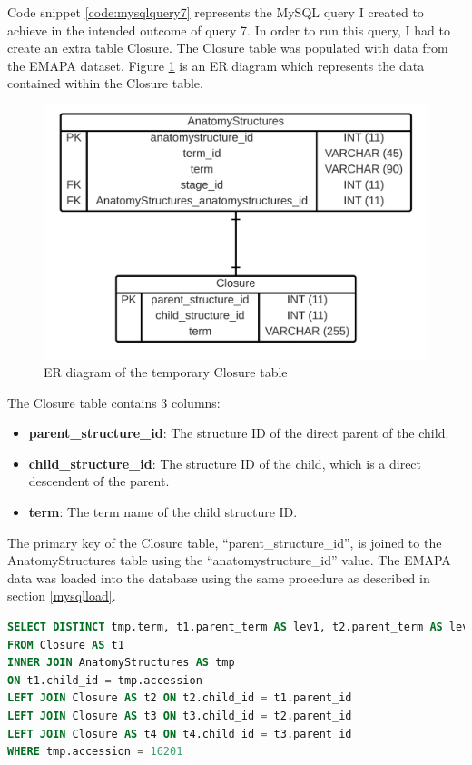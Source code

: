 Code snippet \ref{code:mysqlquery7} represents the MySQL query I created to achieve in the intended outcome of query 7. In order to run this query, I had to create an extra table Closure. The Closure table was populated with data from the EMAPA dataset. Figure \ref{fig:closuretable} is an ER diagram which represents the data contained within the Closure table.

\begin{figure}[H]\begin{center}\includegraphics[width=1\linewidth]{images/closuretableER}\caption{ER diagram of the temporary Closure table}\label{fig:closuretable}\end{center}\end{figure}

The Closure table contains 3 columns:

\begin{itemize}
\item \textbf{parent\_structure\_id}: The structure ID of the direct parent of the child.
\item \textbf{child\_structure\_id}: The structure ID of the child, which is a direct descendent of the parent.
\item \textbf{term}: The term name of the child structure ID.
\end{itemize}

The primary key of the Closure table, ``parent\_structure\_id'', is joined to the AnatomyStructures table using the ``anatomystructure\_id'' value. The EMAPA data was loaded into the database using the same procedure as described in section \ref{mysqlload}.

\begin{lstlisting}[language=SQL, caption=MySQL query 7 statement. Calculate transitive closure., label=code:mysqlquery7]
SELECT DISTINCT tmp.term, t1.parent_term AS lev1, t2.parent_term AS lev2, t3.parent_term AS lev3, t4.parent_term AS lev4
FROM Closure AS t1
INNER JOIN AnatomyStructures AS tmp
ON t1.child_id = tmp.accession
LEFT JOIN Closure AS t2 ON t2.child_id = t1.parent_id
LEFT JOIN Closure AS t3 ON t3.child_id = t2.parent_id
LEFT JOIN Closure AS t4 ON t4.child_id = t3.parent_id
WHERE tmp.accession = 16201
\end{lstlisting}

